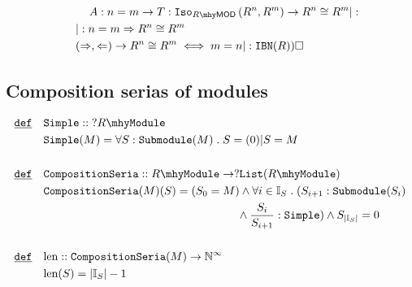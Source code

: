 \documentclass[12pt]{article}
\renewcommand{\.}{\; . \;}
\newcommand{\nat}{\mathbb{N}}
\newcommand{\De}{\underline{\mathtt{def}} \quad}
\newcommand{\module}[1]{{#1} \mhy \mathtt{Module}}
\newcommand{\submodule}[1]{\mathtt{Submodule}(#1)}
\newcommand{\MOD}[1]{#1 \mhy \mathsf{MOD} }
\newcommand{\iso}[3]{\mathtt{Iso}_{#1}\left(#2,#3 \right)}
\newcommand{\simple}{\mathtt{Simple}}
\newcommand{\comps}{\mathtt{CompositionSeria}}
\newcommand{\List}{\mathtt{List}}
\begin{document}
\begin{align*}
& \kern 2pc A : n = m \to T : \iso{\MOD{R}}{R^n}{R^m} \to R^n \cong R^m |: \\
& \kern 1pc |: n = m \Rightarrow R^n \cong R^m \\
& \kern 1pc (\Rightarrow, \Leftarrow) \to  R^n \cong R^m \iff m = n | : \mathtt{IBN}(R) )  \square
\end{align*} 
\newpage
\subsection{Composition serias of modules}
\begin{align*}
\De & \simple :: \;   ?\module{R}  \\
& \simple(M) = \forall S : \submodule{M} \. S = (0) | S = M \\ \\
\De  & \comps :: \module{R} \to ? \List(\module{R}) \\
	 &\comps(M)(S) = (S_0 = M) \wedge \forall i \in \mathbb{I}_S \. 
	 ( S_{i + 1} : \submodule{S_i} \\
	 & \kern 14pc \; \wedge \frac{S_i}{S_{i+1}} : \simple) \wedge S_{|\mathbb{I}_S|} = 0 \\ \\
\De  & \mathrm{len} :: \comps(M) \to \nat^\infty \\
     &  \mathrm{len}(S) = |\mathbb{I}_S| - 1
\end{align*}
\newpage
\end{document}
